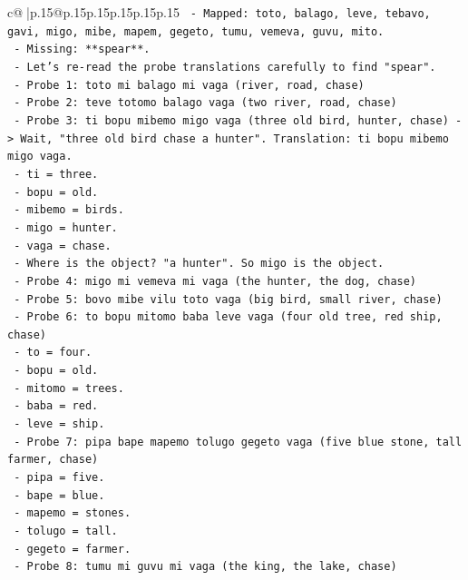 \documentclass{article}
\begin{document}
{\begin{supertabular}{c@{$\;$}|p{.15\linewidth}@{}p{.15\linewidth}p{.15\linewidth}p{.15\linewidth}p{.15\linewidth}p{.15\linewidth}}
{{{\texttt{  {-} Mapped: toto, balago, leve, tebavo, gavi, migo, mibe, mapem, gegeto, tumu, vemeva, guvu, mito.} \\
\texttt{  {-} Missing: **spear**.} \\
\texttt{  {-} Let's re{-}read the probe translations carefully to find "spear".} \\
\texttt{  {-} Probe 1: toto mi balago mi vaga (river, road, chase)} \\
\texttt{  {-} Probe 2: teve totomo balago vaga (two river, road, chase)} \\
\texttt{  {-} Probe 3: ti bopu mibemo migo vaga (three old bird, hunter, chase) {-}> Wait, "three old bird chase a hunter". Translation: ti bopu mibemo migo vaga.} \\
\texttt{    {-} ti = three.} \\
\texttt{    {-} bopu = old.} \\
\texttt{    {-} mibemo = birds.} \\
\texttt{    {-} migo = hunter.} \\
\texttt{    {-} vaga = chase.} \\
\texttt{    {-} Where is the object? "a hunter". So migo is the object.} \\
\texttt{  {-} Probe 4: migo mi vemeva mi vaga (the hunter, the dog, chase)} \\
\texttt{  {-} Probe 5: bovo mibe vilu toto vaga (big bird, small river, chase)} \\
\texttt{  {-} Probe 6: to bopu mitomo baba leve vaga (four old tree, red ship, chase)} \\
\texttt{    {-} to = four.} \\
\texttt{    {-} bopu = old.} \\
\texttt{    {-} mitomo = trees.} \\
\texttt{    {-} baba = red.} \\
\texttt{    {-} leve = ship.} \\
\texttt{  {-} Probe 7: pipa bape mapemo tolugo gegeto vaga (five blue stone, tall farmer, chase)} \\
\texttt{    {-} pipa = five.} \\
\texttt{    {-} bape = blue.} \\
\texttt{    {-} mapemo = stones.} \\
\texttt{    {-} tolugo = tall.} \\
\texttt{    {-} gegeto = farmer.} \\
\texttt{  {-} Probe 8: tumu mi guvu mi vaga (the king, the lake, chase)} \\
}}}
\end{supertabular}}
\end{document}
